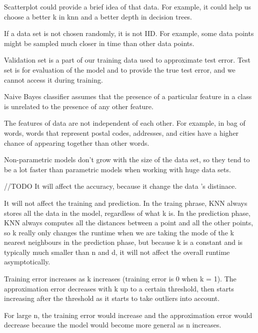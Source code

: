 \documentclass{article}
\def\red#1{{\color{red}#1}}
\begin{document}
\begin{enumerate}
\red{
\item  Scatterplot could provide a brief idea of that data. For example, it could help us choose a better k in knn and a better depth in decision trees.
\item  If a data set is not chosen randomly, it is not IID. For example, some data points might be sampled much closer in time than other data points.
\item Validation set is a part of our training data used to approximate test error. Test set is for evaluation of the model and to provide the true test error, and we cannot access it during training.
\item Naive Bayes classifier assumes that the presence of a particular feature in a class is unrelated to the presence of any other feature.
\item The features of data are not independent of each other. For example, in bag of words, words that represent postal codes, addresses, and cities have a higher chance of appearing together than other words.
\item Non-parametric models don't grow with the size of the data set, so they tend to be a lot faster than parametric models when working with huge data sets.
\item //TODO It will affect the accuracy, because it change the data 's distinace. 
\item It will not affect the training and prediction. In the traing phrase, KNN always stores all the data in the model, regardless of what k is. In the prediction phase, KNN always computes all the distances between a point and all the other points, so k really only changes the runtime when we are taking the mode of the k nearest neighbours in the prediction phase, but because k is a constant and is typically much smaller than n and d, it will not affect the overall runtime asymptotically.
\item Training error increases as k increases (training error is 0 when k = 1). The approximation error decreases with k up to a certain threshold, then starts increasing after the threshold as it starts to take outliers into account.
\item For large n, the training error would increase and the approximation error would decrease because the model would become more general as n increases.
}


\end{enumerate}
\end{document}
